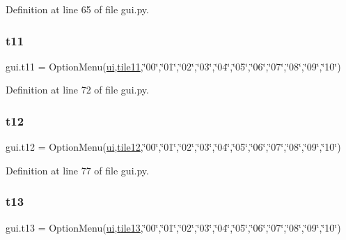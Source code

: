 Definition at line 65 of file gui.\+py.

\mbox{\label{namespacegui_a2ccbb88e04ba8f0634c4dfacd74c3bac}} 
\subsubsection{\texorpdfstring{t11}{t11}}
{\footnotesize\ttfamily gui.\+t11 = Option\+Menu(\mbox{\hyperlink{namespacegui_a40ab7281456eadbea2dc2038f5c24fa1}{ui}},\mbox{\hyperlink{namespacegui_a3c6b012086064f85132d75c185f03f15}{tile11}},\char`\"{}00\char`\"{},\char`\"{}01\char`\"{},\char`\"{}02\char`\"{},\char`\"{}03\char`\"{},\char`\"{}04\char`\"{},\char`\"{}05\char`\"{},\char`\"{}06\char`\"{},\char`\"{}07\char`\"{},\char`\"{}08\char`\"{},\char`\"{}09\char`\"{},\char`\"{}10\char`\"{})}



Definition at line 72 of file gui.\+py.

\mbox{\label{namespacegui_a83d79dd79b185deb01e172ec4188fa17}} 
\subsubsection{\texorpdfstring{t12}{t12}}
{\footnotesize\ttfamily gui.\+t12 = Option\+Menu(\mbox{\hyperlink{namespacegui_a40ab7281456eadbea2dc2038f5c24fa1}{ui}},\mbox{\hyperlink{namespacegui_ae3a967cdb231db565ecb3d01cc1742c6}{tile12}},\char`\"{}00\char`\"{},\char`\"{}01\char`\"{},\char`\"{}02\char`\"{},\char`\"{}03\char`\"{},\char`\"{}04\char`\"{},\char`\"{}05\char`\"{},\char`\"{}06\char`\"{},\char`\"{}07\char`\"{},\char`\"{}08\char`\"{},\char`\"{}09\char`\"{},\char`\"{}10\char`\"{})}



Definition at line 77 of file gui.\+py.

\mbox{\label{namespacegui_a118e7894907edd8ca19acc560b717a9b}} 
\subsubsection{\texorpdfstring{t13}{t13}}
{\footnotesize\ttfamily gui.\+t13 = Option\+Menu(\mbox{\hyperlink{namespacegui_a40ab7281456eadbea2dc2038f5c24fa1}{ui}},\mbox{\hyperlink{namespacegui_ab62f6b286631ccfcc67e468618513305}{tile13}},\char`\"{}00\char`\"{},\char`\"{}01\char`\"{},\char`\"{}02\char`\"{},\char`\"{}03\char`\"{},\char`\"{}04\char`\"{},\char`\"{}05\char`\"{},\char`\"{}06\char`\"{},\char`\"{}07\char`\"{},\char`\"{}08\char`\"{},\char`\"{}09\char`\"{},\char`\"{}10\char`\"{})}



